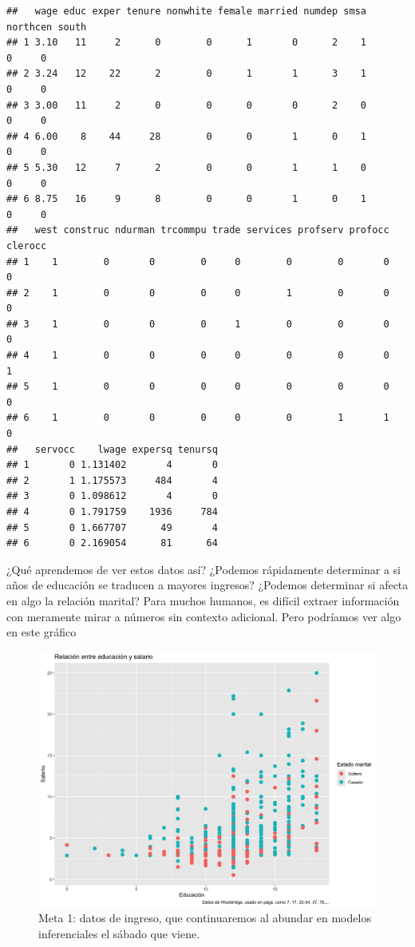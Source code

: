 \documentclass[
]{article}
\begin{document}
\begin{verbatim}
##   wage educ exper tenure nonwhite female married numdep smsa northcen south
## 1 3.10   11     2      0        0      1       0      2    1        0     0
## 2 3.24   12    22      2        0      1       1      3    1        0     0
## 3 3.00   11     2      0        0      0       0      2    0        0     0
## 4 6.00    8    44     28        0      0       1      0    1        0     0
## 5 5.30   12     7      2        0      0       1      1    0        0     0
## 6 8.75   16     9      8        0      0       1      0    1        0     0
##   west construc ndurman trcommpu trade services profserv profocc clerocc
## 1    1        0       0        0     0        0        0       0       0
## 2    1        0       0        0     0        1        0       0       0
## 3    1        0       0        0     1        0        0       0       0
## 4    1        0       0        0     0        0        0       0       1
## 5    1        0       0        0     0        0        0       0       0
## 6    1        0       0        0     0        0        1       1       0
##   servocc    lwage expersq tenursq
## 1       0 1.131402       4       0
## 2       1 1.175573     484       4
## 3       0 1.098612       4       0
## 4       0 1.791759    1936     784
## 5       0 1.667707      49       4
## 6       0 2.169054      81      64
\end{verbatim}

¿Qué aprendemos de ver estos datos así? ¿Podemos rápidamente determinar
a si años de educación se traducen a mayores ingresos? ¿Podemos
determinar si afecta en algo la relación marital? Para muchos humanos,
es difícil extraer información con meramente mirar a números sin
contexto adicional. Pero podríamos ver algo en este gráfico

\begin{figure}
\centering
\includegraphics{Relación.png}
\caption{Meta 1: datos de ingreso, que continuaremos al abundar en
modelos inferenciales el sábado que viene.}
\end{figure}
\end{document}
